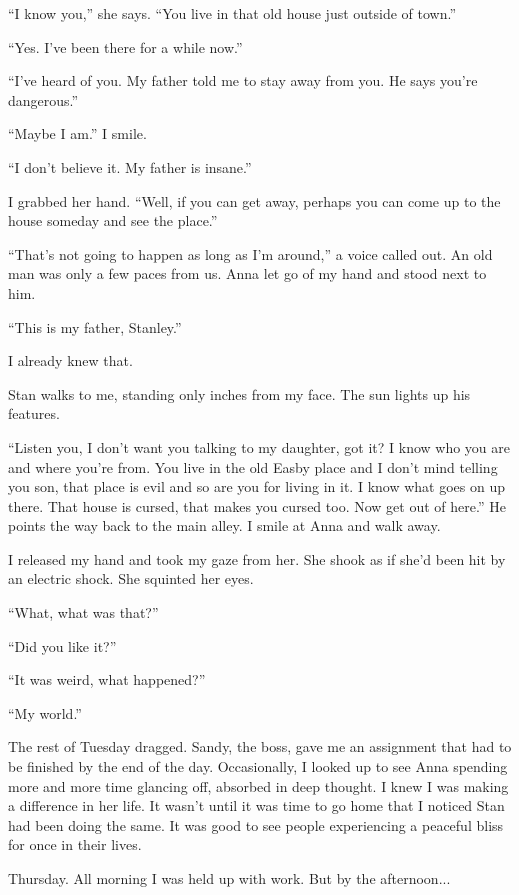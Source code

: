 ``I know you,'' she says. ``You live in that old house just outside of
town.''

``Yes. I've been there for a while now.''

``I've heard of you. My father told me to stay away from you. He says
you're dangerous.''

``Maybe I am.'' I smile.

``I don't believe it. My father is insane.''

I grabbed her hand. ``Well, if you can get away, perhaps you can come up
to the house someday and see the place.''

``That's not going to happen as long as I'm around,'' a voice called
out. An old man was only a few paces from us. Anna let go of my hand and
stood next to him.

``This is my father, Stanley.''

I already knew that.

Stan walks to me, standing only inches from my face. The sun lights up
his features.

``Listen you, I don't want you talking to my daughter, got it? I know
who you are and where you're from. You live in the old Easby place and I
don't mind telling you son, that place is evil and so are you for living
in it. I know what goes on up there. That house is cursed, that makes
you cursed too. Now get out of here.'' He points the way back to the
main alley. I smile at Anna and walk away.

I released my hand and took my gaze from her. She shook as if she'd been
hit by an electric shock. She squinted her eyes.

``What, what was that?''

``Did you like it?''

``It was weird, what happened?''

``My world.''

The rest of Tuesday dragged. Sandy, the boss, gave me an assignment that
had to be finished by the end of the day. Occasionally, I looked up to
see Anna spending more and more time glancing off, absorbed in deep
thought. I knew I was making a difference in her life. It wasn't until
it was time to go home that I noticed Stan had been doing the same. It
was good to see people experiencing a peaceful bliss for once in their
lives.

Thursday. All morning I was held up with work. But by the afternoon...

